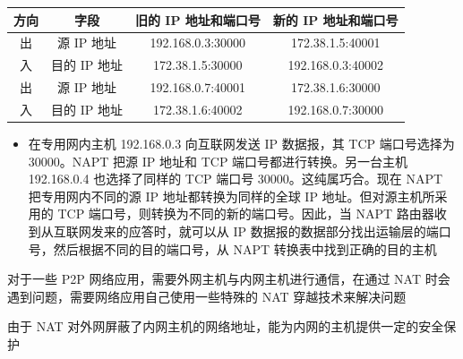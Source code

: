 \documentclass[cs4size,a4paper,10pt]{ctexart}
\begin{document}
	\begin{table}[H]
		\centering
		\begin{tabular}{|c|c|c|c|}
		\hline
		方向 & 字段       & 旧的 IP 地址和端口号      & 新的 IP 地址和端口号      \\ \hline
		出  & 源 IP 地址  & 192.168.0.3:30000 & 172.38.1.5:40001  \\ \hline
		入  & 目的 IP 地址 & 172.38.1.5:30000  & 192.168.0.3:40002 \\ \hline
		出  & 源 IP 地址  & 192.168.0.7:40001 & 172.38.1.6:30000  \\ \hline
		入  & 目的 IP 地址 & 172.38.1.6:40002  & 192.168.0.7:30000 \\ \hline
		\end{tabular}
	\end{table}

	\begin{itemize}
		\item 在专用网内主机 192.168.0.3 向互联网发送 IP 数据报，其 TCP 端口号选择为 30000。NAPT 把源 IP 地址和 TCP 端口号都进行转换。另一台主机 192.168.0.4 也选择了同样的 TCP 端口号 30000。这纯属巧合。现在 NAPT 把专用网内不同的源 IP 地址都转换为同样的全球 IP 地址。但对源主机所采用的 TCP 端口号，则转换为不同的新的端口号。因此，当 NAPT 路由器收到从互联网发来的应答时，就可以从 IP 数据报的数据部分找出运输层的端口号，然后根据不同的目的端口号，从 NAPT 转换表中找到正确的目的主机
	\end{itemize}

	对于一些 P2P 网络应用，需要外网主机与内网主机进行通信，在通过 NAT 时会遇到问题，需要网络应用自己使用一些特殊的 NAT 穿越技术来解决问题

	由于 NAT 对外网屏蔽了内网主机的网络地址，能为内网的主机提供一定的安全保护
\end{document}
